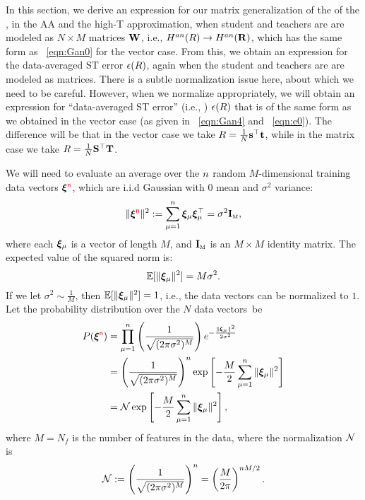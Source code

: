 In this section, we derive an expression for our matrix generalization of the \AnnealedHamiltonian of the \LinearPerceptron,
in the AA and the high-T approximation, when student and teachers are are modeled as $N \times M$ matrices ${\mathbf{W}}$,
i.e., $H^{an}(R)\rightarrow H^{an}(\mathbf{R})$, which has the same form as \EQN~\ref{eqn:Gan0} for the vector case.
%
From this, we obtain an expression for the data-averaged ST error $\epsilon(R)$, again when the student and teachers are are modeled as matrices.
There is a subtle normalization issue here, about which we need to be careful.
However, when we normalize appropriately, we will obtain an expression
for ``data-averaged ST error'' (i.e., \EffectivePotential) $\epsilon(R)$ that is of the same form as we obtained in the vector case (as given in \EQN~\ref{eqn:Gan4} and \EQN~\ref{eqn:e0}).
%
The difference will be that in the vector case we take $R=\tfrac{1}{N}{\mathbf{s}}^{\top}{\mathbf{t}}$, while in the matrix case we take $R=\tfrac{1}{N}{\mathbf{S}}^{\top}{\mathbf{T}}$.

We will need to evaluate an average over the $n$ random $M$-dimensional training data vectors $\boldsymbol{\xi}^{{\color{red}\sf{n}}}$,
which are i.i.d Gaussian with $0$ mean and $\sigma^{2}$ variance: 
\begin{equation}
  \label{eqn:XInorm}
  \Vert \boldsymbol{\xi}^{{\color{red}\sf{n}}} \Vert^2 :=\sum_{\mu=1}^{n} \boldsymbol{\xi}_\mu \boldsymbol{\xi}_\mu^{\top} = \sigma^{2}\mathbf{I}_{\text{\tiny M}} ,
\end{equation}
where each $\boldsymbol{\xi}_{\mu}$ is a vector of length $M$, and $\mathbf{I}_{\text{\tiny M}}$ is an $M \times M$ identity matrix.
%
The expected value of the squared norm is:
\begin{equation}
\mathbb{E}[\Vert \boldsymbol{\xi}_{\mu} \Vert^2] = M \sigma^2 .
\end{equation}
If we let $\sigma^{2}\sim\tfrac{1}{M}$, 
then $\mathbb{E}[\Vert \boldsymbol{\xi}_{\mu} \Vert^2]=1$, i.e., the data vectors can be normalized to $1$.
%
Let the probability distribution over the $N$ data vectors~be
\begin{align}
\nonumber
  P(\boldsymbol{\xi}^{{\color{red}\sf{n}}}) &= \prod_{\mu=1}^{n} \left( \frac{1}{\sqrt{(2 \pi \sigma^2)^M}} \right) e^{-\frac{\|\boldsymbol{\xi}_{\mu}\|^2}{2 \sigma^2}} \\ 
\nonumber
  &= \left( \frac{1}{\sqrt{(2 \pi \sigma^2)^M}} \right)^{n} \exp\left[-\frac{M}{2}\sum_{\mu=1}^{n}\|\boldsymbol{\xi}_{\mu}\|^2\right] \\ 
  \label{eqn:pndx_vec}
  &= \mathcal{N} \exp\left[-\frac{M}{2}\sum_{\mu=1}^{n}\|\boldsymbol{\xi}_{\mu}\|^2\right] ,
\end{align}
where $M=N_f$ is the number of features in the data, where the normalization $\mathcal{N}$ is
\begin{align}
\label{eqn:xinorm}
\mathcal{N} 
:=\left( \frac{1}{\sqrt{(2 \pi \sigma^2)^M}} \right)^{n}
 =\left( \frac{M}{2\pi} \right)^{n M/2} .
\end{align}

